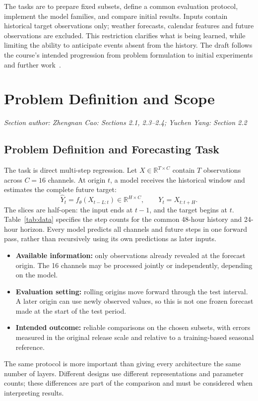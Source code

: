 \documentclass[11pt,a4paper]{article}
\newcommand{\sectionauthor}[1]{\noindent\textit{Section author: #1}\par\vspace{3pt}}
\begin{document}
The tasks are to prepare fixed subsets, define a common evaluation protocol, implement the model families, and compare initial results. Inputs contain historical target observations only; weather forecasts, calendar features and future observations are excluded. This restriction clarifies what is being learned, while limiting the ability to anticipate events absent from the history. The draft follows the course's intended progression from problem formulation to initial experiments and further work~\cite{course}.

\FloatBarrier
\section{Problem Definition and Scope}\label{sec:problem}
\sectionauthor{Zhengnan Cao: Sections 2.1, 2.3--2.4; Yuchen Yang: Section 2.2}
\subsection{Problem Definition and Forecasting Task}
The task is direct multi-step regression. Let $X\in\mathbb{R}^{T\times C}$ contain $T$ observations across $C=16$ channels. At origin $t$, a model receives the historical window and estimates the complete future target:
\begin{equation}\label{eq:task}
\widehat{Y}_{t}=f_{\theta}(X_{t-L:t})\in\mathbb{R}^{H\times C},
\qquad Y_t=X_{t:t+H}.
\end{equation}
The slices are half-open: the input ends at $t-1$, and the target begins at $t$. Table~\ref{tab:data} specifies the step counts for the common 48-hour history and 24-hour horizon. Every model predicts all channels and future steps in one forward pass, rather than recursively using its own predictions as later inputs.

\begin{itemize}
\item \textbf{Available information:} only observations already revealed at the forecast origin. The 16 channels may be processed jointly or independently, depending on the model.
\item \textbf{Evaluation setting:} rolling origins move forward through the test interval. A later origin can use newly observed values, so this is not one frozen forecast made at the start of the test period.
\item \textbf{Intended outcome:} reliable comparisons on the chosen subsets, with errors measured in the original release scale and relative to a training-based seasonal reference.
\end{itemize}
The same protocol is more important than giving every architecture the same number of layers. Different designs use different representations and parameter counts; these differences are part of the comparison and must be considered when interpreting results.
\end{document}

